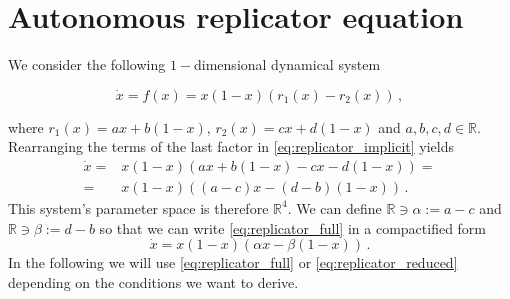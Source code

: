 \documentclass[../main.tex]{subfiles}
\begin{document}
\section{Autonomous replicator equation}\label{sec:aut_replicator}
We consider the following $1-$dimensional dynamical system

\begin{equation}\label{eq:replicator_implicit}
        \dot{x} = f(x) = x(1-x)(r_{1}(x) - r_{2}(x))\,,
\end{equation}

where $r_{1}(x) = ax + b(1-x)$, $r_{2}(x) = cx + d(1-x)$ and $a,b,c,d\in \mathbb{R}$.
Rearranging the terms of the last factor in \eqref{eq:replicator_implicit} yields
\begin{align}
        \dot{x} =& x(1-x)(ax + b(1-x) - cx - d(1-x)) = \nonumber \\
                =&  x(1-x)((a-c)x - (d-b)(1-x)) \,. \label{eq:replicator_full}
\end{align}
This system's parameter space is therefore $\mathbb{R}^{4}$.
We can define $\mathbb{R}\ni \alpha:=a-c$ and $\mathbb{R}\ni \beta:=d-b$ so that we can write \eqref{eq:replicator_full} in a compactified form
\begin{equation}\label{eq:replicator_reduced}
        \dot{x} = x(1-x)(\alpha x - \beta(1-x))\,.
\end{equation}
In the following we will use \eqref{eq:replicator_full} or \eqref{eq:replicator_reduced} depending on the conditions we want to derive.


\end{document}
